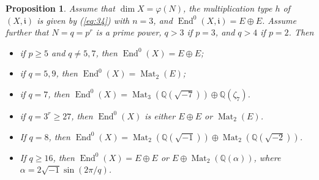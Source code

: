 \documentclass{amsart}[11pt]
\newtheorem{prop}[thm]{Proposition}
\theoremstyle{definition}
\numberwithin{equation}{section}
\theoremstyle{notitle}
\begin{document}
\begin{prop}\label{prop:centralizer-is-e-plus-e}
  Assume that $\dim X= \varphi(N)$, the multiplication type $h$ of
  $(X, {\mathfrak{i}})$ is given by (\ref{eq:34}) with $n=3$, and $\operatorname{End}^0(X,
  {\mathfrak{i}})=E\oplus E$. Assume further that $N=q=p^r$ is a prime power,
  $q>3$ if $p=3$, and $q>4$ if $p=2$. Then
  \begin{itemize}
  \item if $p\geq 5$ and $q\neq 5, 7$, then $\operatorname{End}^0(X)= E\oplus E$;
  \item if $q=5, 9$, then $\operatorname{End}^0(X)= \operatorname{Mat}_2(E)$; 
  \item if $q=7$, then $\operatorname{End}^0(X)= \operatorname{Mat}_3({\mathbb{Q}}(\sqrt{-7}))\oplus
    {\mathbb{Q}}(\zeta_7)$. 
  \item if $q=3^r\geq 27$, then $\operatorname{End}^0(X)$ is either $E\oplus E$ or
    $\operatorname{Mat}_2(E)$. 
  \item If $q=8$, then $\operatorname{End}^0(X)=\operatorname{Mat}_2({\mathbb{Q}}(\sqrt{-1}))\oplus
    \operatorname{Mat}_2({\mathbb{Q}}(\sqrt{-2}))$. 
  \item If $q\geq 16$, then $\operatorname{End}^0(X)=E\oplus E$ or $E\oplus
    \operatorname{Mat}_2({\mathbb{Q}}(\alpha))$, where $\alpha= 2\sqrt{-1}\sin(2\pi/q)$.  
  \end{itemize}
\end{prop}
\end{document}
